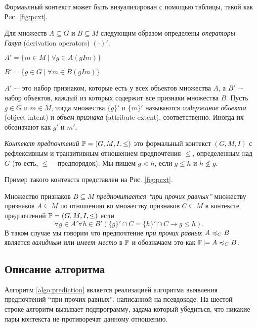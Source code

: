 		Формаьлный контекст может быть визуализирован с помощью таблицы, такой как Рис. \ref{fig:pcxt}.
		
		Для множеств $A \subseteq G$ и $B \subseteq M$ следующим образом определены \emph{операторы Галуа} (derivation operators) $(\cdot)'$:
		\begin{center}
			$A'=\{m \in M \mid \forall g \in A (g I m)\}$
			
			$B'=\{g \in G \mid \forall m \in B (g I m)\}$
		\end{center}
		$A'$ -– это набор признаком, которые есть у всех объектов множества $A$, а $B'$  –- набор объектов, каждый из которых содержит все признаки множества $B$. Пусть $g \in G$ и $m \in M$, тогда множества $\{g\}'$ и $\{m\}'$ называются \emph{содержание объекта} (object intent) и \emph{объем признака} (attribute extent), соответственно. Иногда их обозначают как $g'$ и $m'$.
		
		\begin{definition}
			\emph{Контекст предпочтений} $\mathbb{P} = (G, M, I, \leq)$ это формальный контекст $(G, M, I)$ с рефлексивным и транзитивным отношением предпочтения $\leq$, определенным над $G$ (то есть, $\leq$ – предпорядок). Мы пишем $g < h$, если $g \leq h$ и $h \not\leq g$.
		\end{definition}
		
		Пример такого контекста представлен на Рис. \ref{fig:pcxt}.
		
		\begin{definition}
			Множество признаков $B \subseteq M$ \emph{предпочитается \enquote{при прочих равных}} множеству признаков $A \subseteq M$ по отношению ко множеству признаков $C \subseteq M$ в контексте предпочтений $\mathbb{P} = (G, M, I, \leq)$ если 
			\[\forall g \in A' \forall h \in B'(\{g\}' \cap C = \{h\}' \cap C \to g \leq h).\]
			В таком случае мы говорим что предпочтение \emph{при прочих равных} $A \preccurlyeq_{C} B$ является \emph{валидным} или \emph{имеет место} в $\mathbb{P}$ и обозначаем это как $\mathbb{P} \models A \preccurlyeq_{C} B$.
		\end{definition}
	
	\subsection{Описание алгоритма}
		Алгоритм \ref{algo:prediction} является реализацией алгоритма выявления предпочтений \enquote{при прочих равных}, написанной на псевдокоде. На шестой строке алгоритм вызывает подпрограмму, задача который убедиться, что никакие пары контекста не противоречат данному отношению.
		
